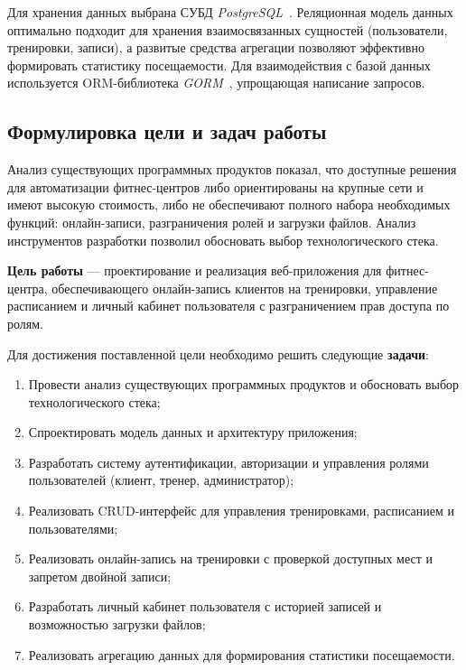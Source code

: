 Для хранения данных выбрана СУБД \textit{PostgreSQL}~\cite{postgresql_docs}.
Реляционная модель данных оптимально подходит для хранения взаимосвязанных
сущностей (пользователи, тренировки, записи), а развитые средства агрегации
позволяют эффективно формировать статистику посещаемости. Для взаимодействия
с базой данных используется ORM-библиотека \textit{GORM}~\cite{gorm_docs},
упрощающая написание запросов.

\subsection{Формулировка цели и задач работы}

Анализ существующих программных продуктов показал, что доступные решения
для автоматизации фитнес-центров либо ориентированы на крупные сети и имеют
высокую стоимость, либо не обеспечивают полного набора необходимых функций:
онлайн-записи, разграничения ролей и загрузки файлов. Анализ инструментов
разработки позволил обосновать выбор технологического стека.

\textbf{Цель работы} --- проектирование и реализация веб-приложения для
фитнес-центра, обеспечивающего онлайн-запись клиентов на тренировки,
управление расписанием и личный кабинет пользователя с разграничением
прав доступа по ролям.

Для достижения поставленной цели необходимо решить следующие \textbf{задачи}:
\begin{enumerate}
	\item Провести анализ существующих программных продуктов и обосновать
	      выбор технологического стека;
	\item Спроектировать модель данных и архитектуру приложения;
	\item Разработать систему аутентификации, авторизации и управления ролями
	      пользователей (клиент, тренер, администратор);
	\item Реализовать CRUD-интерфейс для управления тренировками, расписанием
	      и пользователями;
	\item Реализовать онлайн-запись на тренировки с проверкой доступных мест
	      и запретом двойной записи;
	\item Разработать личный кабинет пользователя с историей записей и
	      возможностью загрузки файлов;
	\item Реализовать агрегацию данных для формирования статистики посещаемости.
\end{enumerate}